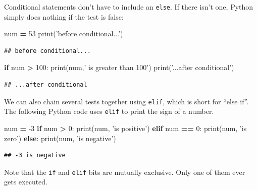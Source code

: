 \documentclass[]{book}
\newenvironment{Shaded}{\begin{snugshade}}{\end{snugshade}}
\newcommand{\BuiltInTok}[1]{#1}
\newcommand{\ControlFlowTok}[1]{\textcolor[rgb]{0.13,0.29,0.53}{\textbf{#1}}}
\newcommand{\DecValTok}[1]{\textcolor[rgb]{0.00,0.00,0.81}{#1}}
\newcommand{\NormalTok}[1]{#1}
\newcommand{\OperatorTok}[1]{\textcolor[rgb]{0.81,0.36,0.00}{\textbf{#1}}}
\newcommand{\StringTok}[1]{\textcolor[rgb]{0.31,0.60,0.02}{#1}}
\theoremstyle{definition}
\theoremstyle{definition}
\theoremstyle{definition}
\theoremstyle{remark}
\begin{document}
Conditional statements don't have to include an \texttt{else}. If there
isn't one, Python simply does nothing if the test is false:

\begin{Shaded}
\begin{Highlighting}[]
\NormalTok{num }\OperatorTok{=} \DecValTok{53}
\BuiltInTok{print}\NormalTok{(}\StringTok{'before conditional...'}\NormalTok{)}
\end{Highlighting}
\end{Shaded}

\begin{verbatim}
## before conditional...
\end{verbatim}

\begin{Shaded}
\begin{Highlighting}[]
\ControlFlowTok{if}\NormalTok{ num }\OperatorTok{>} \DecValTok{100}\NormalTok{:}
    \BuiltInTok{print}\NormalTok{(num,}\StringTok{' is greater than 100'}\NormalTok{)}
\BuiltInTok{print}\NormalTok{(}\StringTok{'...after conditional'}\NormalTok{)}
\end{Highlighting}
\end{Shaded}

\begin{verbatim}
## ...after conditional
\end{verbatim}

We can also chain several tests together using \texttt{elif}, which is
short for ``else if''. The following Python code uses \texttt{elif} to
print the sign of a number.

\begin{Shaded}
\begin{Highlighting}[]
\NormalTok{num }\OperatorTok{=} \DecValTok{-3}
\ControlFlowTok{if}\NormalTok{ num }\OperatorTok{>} \DecValTok{0}\NormalTok{:}
    \BuiltInTok{print}\NormalTok{(num, }\StringTok{'is positive'}\NormalTok{)}
\ControlFlowTok{elif}\NormalTok{ num }\OperatorTok{==} \DecValTok{0}\NormalTok{:}
    \BuiltInTok{print}\NormalTok{(num, }\StringTok{'is zero'}\NormalTok{)}
\ControlFlowTok{else}\NormalTok{:}
    \BuiltInTok{print}\NormalTok{(num, }\StringTok{'is negative'}\NormalTok{)}
\end{Highlighting}
\end{Shaded}

\begin{verbatim}
## -3 is negative
\end{verbatim}

Note that the \texttt{if} and \texttt{elif} bits are mutually exclusive.
Only one of them ever gets executed.
\end{document}

